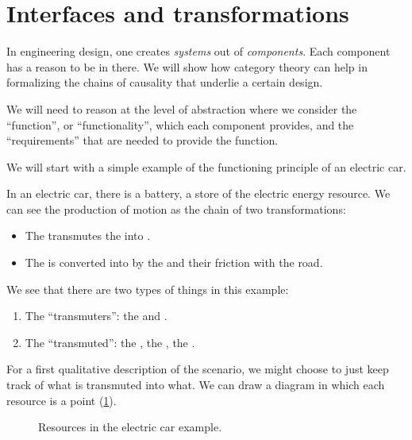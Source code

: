 
\section{Interfaces and transformations}



In engineering design, one creates \emph{systems} out of \emph{components}. Each component has a reason to be in there. We will show how category theory can help in formalizing the chains of causality that underlie a certain design.

We will need to reason at the level of abstraction where we consider the ``function'', or ``functionality'', which each component provides, and the ``requirements'' that are needed to provide the function.

We will start with a simple example of the functioning principle of an electric car.

In an electric car, there is a battery, a store of the electric energy resource. We can see the production of motion as the chain of two transformations:

\begin{itemize}
  \item The \motor transmutes the \electricpower into \rotationalmotion.
  \item The \rotationalmotion is converted into \translationalmotion by the \wheels and their friction with the road.
\end{itemize}

We see that there are two types of things in this example:
\begin{enumerate}
  \item The ``transmuters'': the \motor and \wheels.
  \item The ``transmuted'': the \electricpower, the \rotationalmotion, the \translationalmotion.
\end{enumerate}

For a first qualitative description of the scenario, we might choose to just keep track of what is transmuted into what. We can draw a diagram in which each resource is a point (\cref{fig:e1}).

\begin{figure}[h!]
  \centering
  \caption{Resources in the electric car example. \label{fig:e1} }
\end{figure}



